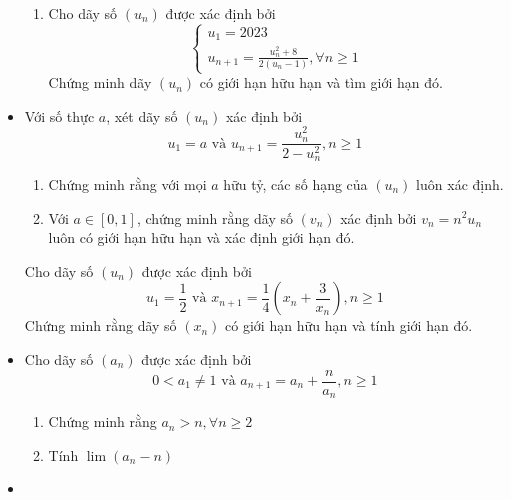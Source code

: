 \documentclass[11pt]{scrartcl}
\begin{document}
\begin{itemize}[label=, leftmargin=0em, itemsep=-0em]
\begin{btvn}
\begin{enumerate}
            \item Cho dãy số $(u_n)$ được xác định bởi
            \[\left\{
                \begin{array}{l}
                    u_1 = 2023\\
                    u_{n + 1} = \frac{u_n^2 + 8}{2(u_n - 1)}, \forall n \geq 1
                \end{array}
            \right.
            \]
            Chứng minh dãy $(u_n)$ có giới hạn hữu hạn và tìm giới hạn đó.
        \end{enumerate}
    \end{btvn}
    \item \begin{btvn} Với số thực $a$, xét dãy số $(u_n)$ xác định bởi
    \[
        u_1 = a \text{ và } u_{n + 1} = \frac{u_n^2}{2 - u_n^2}, n \geq 1
    \]
    \begin{enumerate}
        \item Chứng minh rằng với mọi $a$ hữu tỷ, các số hạng của $(u_n)$ luôn xác định.
        \item Với $a \in [0,1]$, chứng minh rằng dãy số $(v_n)$ xác định bởi $v_n = n^2 u_n$ luôn có giới hạn hữu hạn và xác định giới hạn đó.
    \end{enumerate}
    \end{btvn}
    \begin{btvn} Cho dãy số $(u_n)$ được xác định bởi
        \[
            u_1 = \frac{1}{2} \text{ và } x_{n + 1} = \frac{1}{4} \left(x_n + \frac{3}{x_n}\right), n \geq 1
        \]
    Chứng minh rằng dãy số $(x_n)$ có giới hạn hữu hạn và tính giới hạn đó.
    \end{btvn}
    \item \begin{btvn}
        Cho dãy số $(a_n)$ được xác định bởi
        \[
            0 < a_1 \neq 1 \text{ và } a_{n + 1} = a_n + \frac{n}{a_n}, n \geq 1 
        \]
        \begin{enumerate}[label=(\alph*)]
            \item Chứng minh rằng $a_n > n, \forall n \geq 2$
            \item Tính $\lim (a_n - n)$
        \end{enumerate}
    \end{btvn}
    \item \begin{btvn}

\end{btvn}
\end{itemize}
\end{document}
